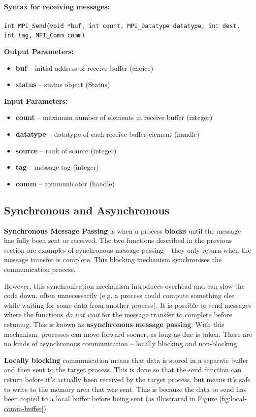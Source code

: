 \documentclass{article}
\begin{document}
\paragraph{Syntax for receiving messages:}
\texttt{int MPI\_Send(void *buf, int count, MPI\_Datatype datatype, int dest, int tag, MPI\_Comm comm)}

\textbf{Output Parameters:}
\begin{itemize}
	\item \textbf{buf} -- initial address of receive buffer (choice)
	\item \textbf{status} -- status object (Status)
\end{itemize}
\textbf{Input Parameters:}
\begin{itemize}
	\item \textbf{count} -- maximum number of elements in receive buffer (integer)
	\item \textbf{datatype} -- datatype of each receive buffer element (handle)
	\item \textbf{source} -- rank of source (integer)
	\item \textbf{tag} -- message tag (integer)
	\item \textbf{comm} -- communicator (handle)
\end{itemize}

\subsection{Synchronous and Asynchronous}

\textbf{Synchronous Message Passing} is when a process \textbf{blocks} until the message has fully been sent or received. The two functions described in the previous section are examples of synchronous message passing -- they only return when the message transfer is complete. This blocking mechanism synchronises the communication process.

However, this synchronisation mechanism introduces overhead and can slow the code down, often unnecessarily (e.g. a process could compute something else while waiting for some data from another process). It is possible to send messages where the functions \textit{do not wait} for the message transfer to complete before retuning. This is known as \textbf{asynchronous message passing}. With this mechanism, processes can move forward sooner, as long as due is taken. There are no kinds of asynchronous communication -- locally blocking and non-blocking.

\textbf{Locally blocking} communication means that data is stored in a separate buffer and then sent to the target process. This is done so that the send function can return before it's actually been received by the target process, but means it's safe to write to the memory area that was sent. This is because the data to send has been copied to a local buffer before being sent (as illustrated in Figure \ref{fig:local-comm-buffer})
\end{document}
